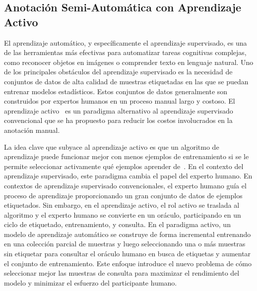 \subsection{Anotación Semi-Automática con Aprendizaje Activo}

El aprendizaje automático, y específicamente el aprendizaje supervisado, es una de las herramientas más efectivas para automatizar tareas cognitivas complejas, como reconocer objetos en imágenes o comprender texto en lenguaje natural.
Uno de los principales obstáculos del aprendizaje supervisado es la necesidad de conjuntos de datos de alta calidad de muestras etiquetadas en las que se puedan entrenar modelos estadísticos.
Estos conjuntos de datos generalmente son construidos por expertos humanos en un proceso manual largo y costoso.
El aprendizaje activo~\cite{Cohn2010ActiveL} es un paradigma alternativo al aprendizaje supervisado convencional que se ha propuesto para reducir los costos involucrados en la anotación manual.

La idea clave que subyace al aprendizaje activo es que un algoritmo de aprendizaje puede funcionar mejor con menos ejemplos de entrenamiento si se le permite seleccionar activamente qué ejemplos aprender de~\cite{seungquery}.
En el contexto del aprendizaje supervisado, este paradigma cambia el papel del experto humano.
En contextos de aprendizaje supervisado convencionales, el experto humano guía el proceso de aprendizaje proporcionando un gran conjunto de datos de ejemplos etiquetados.
Sin embargo, en el aprendizaje activo, el rol activo se traslada al algoritmo y el experto humano se convierte en un oráculo, participando en un ciclo de etiquetado, entrenamiento, y consulta.
En el paradigma activo, un modelo de aprendizaje automático se construye de forma incremental entrenando en una colección parcial de muestras y luego seleccionando una o más muestras sin etiquetar para consultar el oráculo humano en busca de etiquetas y aumentar el conjunto de entrenamiento.
Este enfoque introduce el nuevo problema de cómo seleccionar mejor las muestras de consulta para maximizar el rendimiento del modelo y minimizar el esfuerzo del participante humano.


